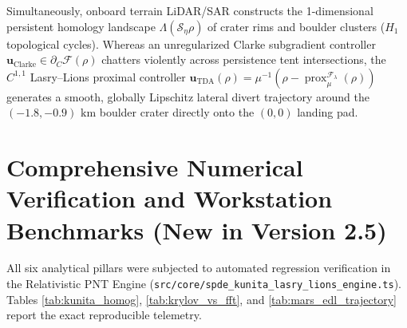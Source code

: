 \documentclass[11pt,a4paper,reqno]{article}
\theoremstyle{definition}
\theoremstyle{remark}
\begin{document}
Simultaneously, onboard terrain LiDAR/SAR constructs the 1-dimensional persistent homology landscape $\Lambda(\mathcal{S}_\eta\rho)$ of crater rims and boulder clusters ($H_1$ topological cycles). Whereas an unregularized Clarke subgradient controller $\mathbf{u}_{\mathrm{Clarke}} \in \partial_C\mathcal{F}(\rho)$ chatters violently across persistence tent intersections, the $C^{1,1}$ Lasry--Lions proximal controller $\mathbf{u}_{\mathrm{TDA}}(\rho) = \mu^{-1}(\rho - \operatorname{prox}_\mu^{\mathcal{F}_\lambda}(\rho))$ generates a smooth, globally Lipschitz lateral divert trajectory around the $(-1.8, -0.9)\text{ km}$ boulder crater directly onto the $(0,0)$ landing pad.

\section{Comprehensive Numerical Verification and Workstation Benchmarks (New in Version 2.5)}

All six analytical pillars were subjected to automated regression verification in the Relativistic PNT Engine (\texttt{src/core/spde\_kunita\_lasry\_lions\_engine.ts}). Tables \ref{tab:kunita_homog}, \ref{tab:krylov_vs_fft}, and \ref{tab:mars_edl_trajectory} report the exact reproducible telemetry.
\end{document}
